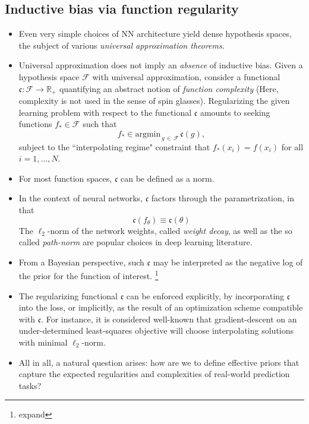 \documentclass[12pt]{article}
\numberwithin{equation}{section}
\theoremstyle{definition}
\newcommand{		\1		}	{	\bm{1}					}%
\begin{document}
\subsection{Inductive bias via function regularity}

\begin{itemize}
\item Even very simple choices of NN architecture yield dense hypothesis spaces, the subject of various \emph{universal approximation theorems}.
 
\item Universal approximation does not imply an \emph{absence} of inductive bias. Given a hypothesis space $\mathcal{F}$ with universal approximation, consider a functional $\mathfrak{c} : \mathcal{F} \to \mathbb{R}_+$ quantifying an abstract notion of \emph{function complexity} (Here, complexity is not used in the sense of spin glasses). Regularizing the given learning problem with respect to the functional $\mathfrak{c}$ amounts to seeking functions $f_* \in \mathcal{F}$ such that 
    $$
    f_* \in \textrm{argmin}_{\, g \,\in\, \mathcal{F}\, } \mathfrak{c}(g),
    $$
    subject to the ``interpolating regime" constraint that $f_*(x_i) = f(x_i)$ for all $i = 1, \dots, N$. 
    
    
\item For most function spaces, $\mathfrak{c}$ can be defined as a norm.

\item In the context of neural networks, $\mathfrak{c}$ factors through the parametrization, in that 
	$$
	\mathfrak{c}(f_\theta) \equiv \mathfrak{c}(\theta)
	$$ 
	The $\ell_2$-norm of the network weights, called \emph{weight decay}, as well as the so called \emph{path-norm} are popular choices in deep learning literature. 

\item From a Bayesian perspective, such $\mathfrak{c}$ may be interpreted as the negative log of the prior for the function of interest. \footnote{expand}

\item The regularizing functional $\mathfrak{c}$ can be enforced explicitly, by incorporating $\mathfrak{c}$ into the loss, or implicitly, as the result of an optimization scheme compatible with $\mathfrak{c}$. For instance, it is considered well-known that gradient-descent on an under-determined least-squares objective will choose interpolating solutions with minimal $\ell_2$-norm. 

\item All in all, a natural question arises: how are we to define effective priors that capture the expected regularities and complexities of real-world prediction tasks?
\end{itemize}
\end{document}
